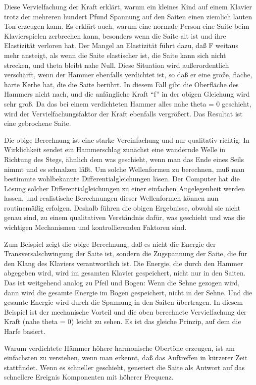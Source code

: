 Diese Vervielfachung der Kraft erklärt, warum ein kleines Kind auf einem Klavier trotz der mehreren hundert Pfund Spannung auf den Saiten einen ziemlich lauten Ton erzeugen kann.
Es erklärt auch, warum eine normale Person eine Saite beim Klavierspielen zerbrechen kann, besonders wenn die Saite alt ist und ihre Elastizität verloren hat.
Der Mangel an Elastizität führt dazu, daß F weitaus mehr ansteigt, als wenn die Saite elastischer ist, die Saite kann sich nicht strecken, und theta bleibt nahe Null.
Diese Situation wird außerordentlich verschärft, wenn der Hammer ebenfalls verdichtet ist, so daß er eine große, flache, harte Kerbe hat, die die Saite berührt.
In diesem Fall gibt die Oberfläche des Hammers nicht nach, und die anfängliche Kraft \enquote{f} in der obigen Gleichung wird sehr groß.
Da das bei einem verdichteten Hammer alles nahe theta = 0 geschieht, wird der Vervielfachungsfaktor der Kraft ebenfalls vergrößert.
Das Resultat ist eine gebrochene Saite.

Die obige Berechnung ist eine starke Vereinfachung und nur qualitativ richtig.
In Wirklichkeit sendet ein Hammerschlag zunächst eine wandernde Welle in Richtung des Stegs, ähnlich dem was geschieht, wenn man das Ende eines Seils nimmt und es schnalzen läßt.
Um solche Wellenformen zu berechnen, muß man bestimmte wohlbekannte Differentialgleichungen lösen.
Der Computer hat die Lösung solcher Differentialgleichungen zu einer einfachen Angelegenheit werden lassen, und realistische Berechnungen dieser Wellenformen können nun routinemäßig erfolgen.
Deshalb führen die obigen Ergebnisse, obwohl sie nicht genau sind, zu einem qualitativen Verständnis dafür, was geschieht und was die wichtigen Mechanismen und kontrollierenden Faktoren sind.

Zum Beispiel zeigt die obige Berechnung, daß es nicht die Energie der Transversalschwingung der Saite ist, sondern die Zugspannung der Saite, die für den Klang des Klaviers verantwortlich ist.
Die Energie, die durch den Hammer abgegeben wird, wird im gesamten Klavier gespeichert, nicht nur in den Saiten.
Das ist weitgehend analog zu Pfeil und Bogen: Wenn die Sehne gezogen wird, dann wird die gesamte Energie im Bogen gespeichert, nicht in der Sehne.
Und die gesamte Energie wird durch die Spannung in den Saiten übertragen.
In diesem Beispiel ist der mechanische Vorteil und die oben berechnete Vervielfachung der Kraft (nahe theta = 0) leicht zu sehen.
Es ist das gleiche Prinzip, auf dem die Harfe basiert.

Warum verdichtete Hämmer höhere harmonische Obertöne erzeugen, ist am einfachsten zu verstehen, wenn man erkennt, daß das Auftreffen in kürzerer Zeit stattfindet.
Wenn es schneller geschieht, generiert die Saite als Antwort auf das schnellere Ereignis Komponenten mit höherer Frequenz.

